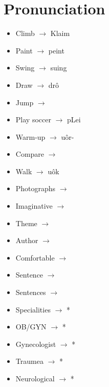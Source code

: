 \section{Pronunciation}
\begin{multicols}{2}
\begin{itemize}
\item Climb $\rightarrow$ Klaim
\item Paint $\rightarrow$ peint
\item Swing $\rightarrow$ suing
\item Draw $\rightarrow$ drô
\item Jump $\rightarrow$ 
\item Play soccer $\rightarrow$ pLei 
\item Warm-up $\rightarrow$ uôr-
\item Compare $\rightarrow$ 
\item Walk $\rightarrow$ uôk
\item Photographs $\rightarrow$ 
\item Imaginative $\rightarrow$ 
\item Theme $\rightarrow$ 
\item Author $\rightarrow$ 
\item Comfortable $\rightarrow$ 
\item Sentence $\rightarrow$ 
\item Sentences $\rightarrow$ 
\item Specialities $\rightarrow$ *
\item OB/GYN $\rightarrow$ *
\item Gynecologist $\rightarrow$ *
\item Traumea $\rightarrow$ *
\item Neurological $\rightarrow$ *
\end{itemize}
\end{multicols}
